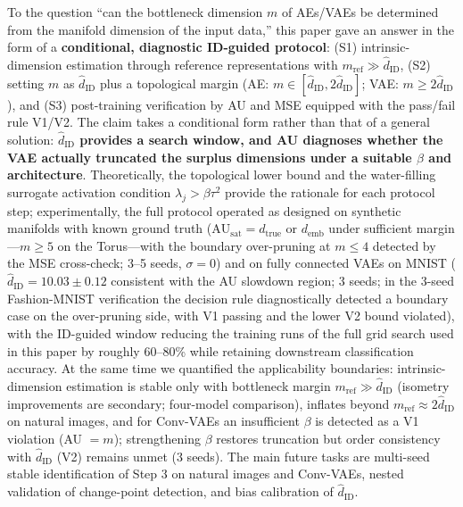 \documentclass[make,article,submit,pdftex,moreauthors]{Definitions/mdpi}
\newcommand{\hatdID}{\hat{d}_{\mathrm{ID}}}
\newcommand{\dtrue}{d_{\mathrm{true}}}
\newcommand{\AUsat}{\mathrm{AU}_{\mathrm{sat}}}
\newcommand{\demb}{d_{\mathrm{emb}}}
\begin{document}
To the question ``can the bottleneck dimension $m$ of AEs/VAEs be determined
from the manifold dimension of the input data,'' this paper gave an answer
in the form of a \textbf{conditional, diagnostic ID-guided protocol}:
(S1) intrinsic-dimension estimation through reference representations with
$m_{\mathrm{ref}} \gg \hatdID$,
(S2) setting $m$ as $\hatdID$ plus a topological margin
(AE: $m \in [\hatdID, 2\hatdID]$; VAE: $m \geq 2\hatdID$), and
(S3) post-training verification by AU and MSE equipped with the pass/fail
rule V1/V2.
The claim takes a conditional form rather than that of a general solution:
\textbf{$\hatdID$ provides a search window, and AU diagnoses whether the
VAE actually truncated the surplus dimensions under a suitable $\beta$ and
architecture}.
Theoretically, the topological lower bound and the water-filling surrogate
activation condition $\lambda_j > \beta\tau^2$ provide the rationale for
each protocol step;
experimentally, the full protocol operated as designed on synthetic
manifolds with known ground truth ($\AUsat = \dtrue$ or $\demb$ under
sufficient margin---$m \geq 5$ on the Torus---with the boundary
over-pruning at $m \leq 4$ detected by the MSE cross-check; 3--5 seeds,
$\sigma = 0$) and on fully connected VAEs on MNIST
($\hatdID = 10.03 \pm 0.12$ consistent with the AU slowdown region;
3 seeds; in the 3-seed Fashion-MNIST verification the decision rule
diagnostically detected a boundary case on the over-pruning side, with V1
passing and the lower V2 bound violated), with the ID-guided window
reducing the training runs of the full
grid search used in this paper by roughly 60--80\% while retaining
downstream classification accuracy.
At the same time we quantified the applicability boundaries:
intrinsic-dimension estimation is stable only with bottleneck margin
$m_{\mathrm{ref}} \gg \hatdID$ (isometry improvements are secondary;
four-model comparison), inflates beyond
$m_{\mathrm{ref}} \approx 2\hatdID$ on natural images, and for Conv-VAEs an
insufficient $\beta$ is detected as a V1 violation (AU $= m$); strengthening
$\beta$ restores truncation but order consistency with $\hatdID$ (V2)
remains unmet (3 seeds).
The main future tasks are multi-seed stable identification of Step 3 on
natural images and Conv-VAEs, nested validation of change-point detection,
and bias calibration of $\hatdID$.


\end{document}
